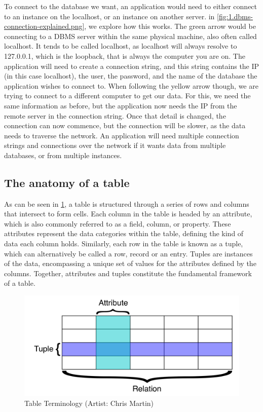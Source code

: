To connect to the database we want, an application would need to either connect to an instance on the localhost, or an instance on another server. in \cref{fig:1.dbms-connection-explained.png}, we explore how this works. The green arrow would be connecting to a DBMS server within the same physical machine, also often called localhost. It tends to be called localhost, as localhost will always resolve to 127.0.0.1, which is the loopback, that is always the computer you are on. The application will need to create a connection string, and this string contains the IP (in this case localhost), the user, the password, and the name of the database the application wishes to connect to. When following the yellow arrow though, we are trying to connect to a different computer to get our data. For this, we need the same information as before, but the application now needs the IP from the remote server in the connection string. Once that detail is changed, the connection can now commence, but the connection will be slower, as the data needs to traverse the network. An application will need multiple connection strings and connections over the network if it wants data from multiple databases, or from multiple instances.

\subsection{The anatomy of a table}
As can be seen in \cref{fig:2.table-definitions.png}, a table is structured through a series of rows and columns that intersect to form cells. Each column in the table is headed by an attribute, which is also commonly referred to as a field, column, or property. These attributes represent the data categories within the table, defining the kind of data each column holds. Similarly, each row in the table is known as a tuple, which can alternatively be called a row, record or an entry. Tuples are instances of the data, encompassing a unique set of values for the attributes defined by the columns. Together, attributes and tuples constitute the fundamental framework of a table.

\begin{figure}[htbp]
    \centering
    \includegraphics[width=1\textwidth]{content/1-relational-databases/figures/2.table-definitions.png}
    \caption{Table Terminology (Artist: Chris Martin)}
    \label{fig:2.table-definitions.png}
\end{figure}

